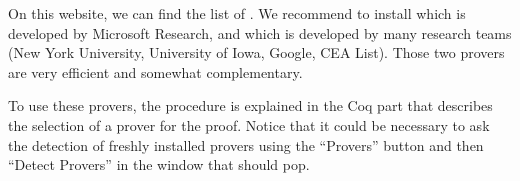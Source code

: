 On this website, we can find the list of
.
We recommend to install
 which is
developed by Microsoft Research, and
 which is developed by many
research teams (New York University, University of Iowa, Google, CEA
List). Those two provers are very efficient and somewhat complementary.



To use these provers, the procedure is explained in the Coq part that
describes the selection of a prover for the proof. Notice that it could
be necessary to ask the detection of freshly installed provers using the
``Provers'' button and then ``Detect Provers'' in the window that should
pop.
